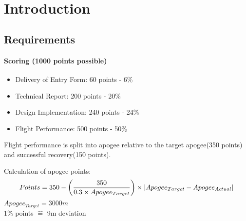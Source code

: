 \chapter{Introduction}

\section{Requirements}

\subsubsection{Scoring (1000 points possible)}
\begin{itemize}
 \item Delivery of Entry Form: 60 points - 6\%
 \item Technical Report: 200 points - 20\%
 \item Design Implementation: 240 points - 24\%
 \item Flight Performance: 500 points - 50\%
\end{itemize}


Flight performance is split into apogee relative to the target apogee(350 points) and successful recovery(150 points).
\par
Calculation of apogee points:
$$ Points = 350 - \left( \frac{350}{0.3 \times Apogee_{Target}} \right) \times \abs{Apogee_{Target} - Apogee_{Actual}} $$
$Apogee_{Target} = 3000m$ \\
1\% points $\widehat{=}$ 9m deviation